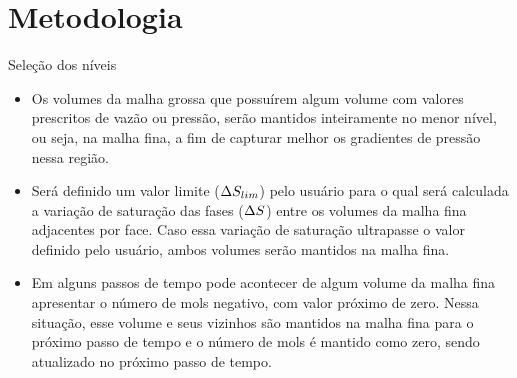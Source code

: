 \documentclass[professionalfont]{beamer}
\begin{document}
\section{Metodologia}
\begin{frame}{Seleção dos níveis}
    \small
    \begin{itemize}
        \item Os volumes da malha grossa que possuírem algum volume com valores prescritos de vazão ou pressão, serão mantidos inteiramente no menor nível, ou seja, na malha fina, a fim de capturar melhor os gradientes de pressão nessa região.
        \item Será definido um valor limite ($\Delta S_{lim}$) pelo usuário para o qual será calculada a variação de saturação das fases ($\Delta S$) entre os volumes da malha fina adjacentes por face. Caso essa variação de saturação ultrapasse o valor definido pelo usuário, ambos volumes serão mantidos na malha fina.
        \item Em alguns passos de tempo pode acontecer de algum volume da malha fina apresentar o número de mols negativo, com valor próximo de zero. Nessa situação, esse volume e seus vizinhos são mantidos na malha fina para o próximo passo de tempo e o número de mols é mantido como zero, sendo atualizado no próximo passo de tempo.
    \end{itemize}
\end{frame}
\end{document}
